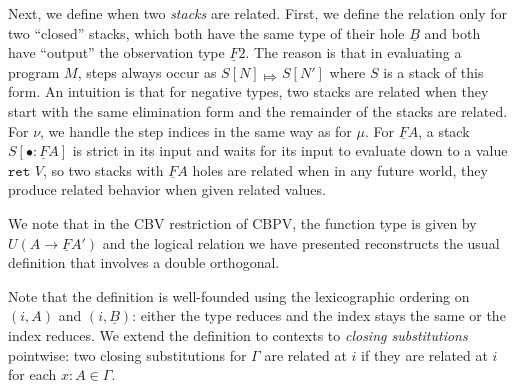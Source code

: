 \documentclass[acmsmall,screen,12pt]{acmart}
\renewcommand{\u}{\underline}
\newcommand{\bigstepsin}[1]{\mathrel{\Mapsto^{#1}}}
\newcommand{\bigstepany}{\bigstepsin{}}
\newcommand{\kw}[1]{\texttt{#1}\,\,}
\newcommand{\ret}{\kw{ret}}
\begin{document}
{\begin{longonly}
Next, we define when two \emph{stacks} are related.
%
First, we define the relation only for two ``closed'' stacks, which 
both have the same type of their hole $\u B$ and both have
``output'' the observation type $\u F 2$.
%
The reason is that in evaluating a program $M$, steps always occur as
$S[N] \bigstepany S[N']$ where $S$ is a stack of this form.
%
An intuition is that for negative types, two stacks are related when
they start with the same elimination form and the remainder of the
stacks are related.
%
For $\nu$, we handle the step indices in the same way as for $\mu$.
%
For $\u F A$, a stack $S[\bullet : \u F A]$ is strict in its input and
waits for its input to evaluate down to a value $\ret V$, so two
stacks with $\u F A$ holes are related when in any future world, they
produce related behavior when given related values.

We note that in the CBV restriction of CBPV, the function type is
given by $U(A \to \u F A')$ and the logical relation we have presented
reconstructs the usual definition that involves a double orthogonal.

Note that the definition is well-founded using the lexicographic
ordering on $(i, A)$ and $(i, \u B)$: either the type reduces and the
index stays the same or the index reduces.
%
We extend the definition to contexts to \emph{closing substitutions}
pointwise: two closing substitutions for $\Gamma$ are related at $i$
if they are related at $i$ for each $x:A \in \Gamma$.
\end{longonly}

}
\end{document}
